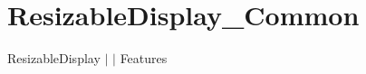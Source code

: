 \chapter{Resizable\+Display\+\_\+\+Common }
\hypertarget{md__docs_2_common_2_features_2_resizable_display___common}{}\label{md__docs_2_common_2_features_2_resizable_display___common}
Resizable\+Display \texorpdfstring{$\vert$}{|}  \texorpdfstring{$\vert$}{|} Features



 